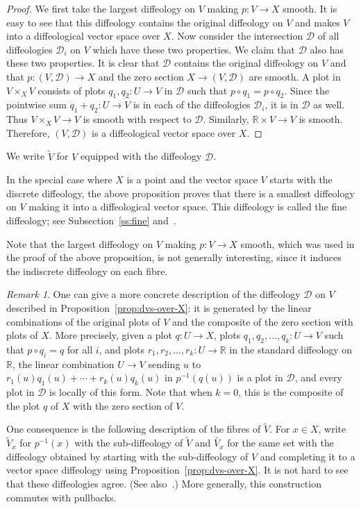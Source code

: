 \documentclass[12pt]{amsart}
\theoremstyle{remark}
\newtheorem{rem}[de]{Remark}
\newcommand{\ra}{\to}
\newcommand{\cD}{{\mathcal{D}}}
\def \R{\mathbb{R}}
\begin{document}
\begin{proof}
We first take the largest diffeology on $V$ making $p: V \to X$ smooth.
It is easy to see that this diffeology contains the original diffeology on $V$
and makes $V$ into a diffeological vector space over $X$.
Now consider the intersection $\cD$ of all diffeologies $\cD_i$ on $V$ which
have these two properties.
We claim that $\cD$ also has these two properties.
It is clear that $\cD$ contains the original diffeology on $V$
and that $p:(V,\cD) \ra X$ and the zero section $X \ra (V,\cD)$ are smooth.
A plot in $V \times_X V$ consists of plots $q_1, q_2 : U \to V$ in $\cD$ such that
$p \circ q_1 = p \circ q_2$.
Since the pointwise sum $q_1+q_2 : U \to V$ is in each of
the diffeologies $\cD_i$, it is in $\cD$ as well.
Thus $V \times_X V \to V$ is smooth with respect to $\cD$.
Similarly, $\R \times V \to V$ is smooth.
Therefore, $(V,\cD)$ is a diffeological vector space over $X$.
\end{proof}

We write $\tilde{V}$ for $V$ equipped with the diffeology $\cD$.

In the special case where $X$ is a point and the vector space $V$ starts with the
discrete diffeology, the above proposition proves that there is a smallest
diffeology on $V$ making it into a diffeological vector space.
This diffeology is called the fine diffeology;
see Subsection~\ref{ss:fine} and~\cite[Chapter~3]{I3}.

Note that the largest diffeology on $V$ making $p: V \to X$ smooth, which
was used in the proof of the above proposition, is not
generally interesting, since it induces the indiscrete diffeology on each fibre.

\begin{rem}\label{rem:alt-description}
One can give a more concrete description of the diffeology $\cD$ on $V$
described in Proposition~\ref{prop:dvs-over-X}:
it is generated by the linear combinations of the original plots of $V$
and the composite of the zero section with plots of $X$.
More precisely, given a plot $q : U \to X$,
plots $q_1, q_2, \ldots, q_k : U \to V$
such that $p \circ q_i = q$ for all $i$,
and plots $r_1, r_2, \ldots, r_k: U \to \R$ in the standard diffeology on $\R$,
the linear combination $U \to V$ sending $u$ to $r_1(u) q_1(u) + \cdots + r_k(u) q_k(u)$
in $p^{-1}(q(u))$ is a plot in $\cD$, and every plot in $\cD$ is locally of this form.
Note that when $k=0$, this is the composite of the plot $q$ of $X$
with the zero section of $V$.

One consequence is the following description of the fibres of $\tilde{V}$.
For $x \in X$, write $\tilde{V}_x$ for $p^{-1}(x)$ with the sub-diffeology of $\tilde{V}$
and $\widetilde{V_x}$ for the same set with the diffeology obtained by
starting with the sub-diffeology of $V$ and completing it to a vector space
diffeology using Proposition~\ref{prop:dvs-over-X}.
It is not hard to see that these diffeologies agree.
(See also~\cite[Proposition~6.2.2(iiii)]{V}.)
More generally, this construction commutes with pullbacks.
\end{rem}
\end{document}
